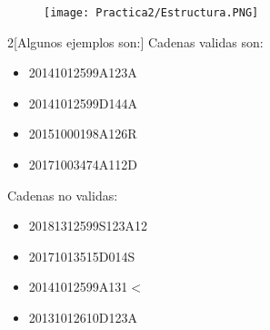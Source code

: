 \documentclass[12pt]{article}
\begin{document}
	\begin{figure}[H]
	        \centering
	        \texttt{[image: Practica2/Estructura.PNG]}
	\end{figure}
	\begin{multicols}{2}[Algunos ejemplos son:]
		Cadenas validas son:
		\begin{itemize}
			\item 20141012599A123A
			\item 20141012599D144A
			\item 20151000198A126R
			\item 20171003474A112D
		\end{itemize}
		\columnbreak
		Cadenas no validas:
		\begin{itemize}
			\item 20181312599S123A12  
			\item 20171013515D014S    
			\item 20141012599A131$<$  
			\item 20131012610D123A  
			\end{itemize}
	\end{multicols}
	\newpage
\end{document}
